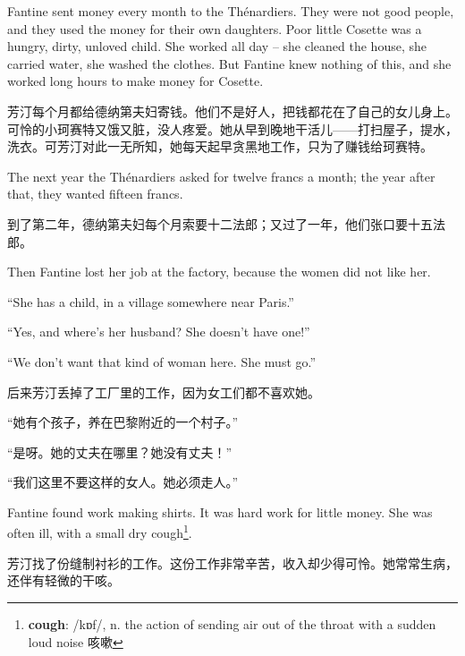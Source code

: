\documentclass[fontset=ubuntu, zihao=5]{ctexart}
\newcommand\doulos[1]{{\fontspec{Doulos SIL} /#1/}}
\begin{document}
\begin{paracol}{2}
  \sectionbreak

  Fantine sent money every month to the Thénardiers. They were not good people, and they used the money for their own daughters. Poor little Cosette was a hungry, dirty, unloved child. She worked all day – she cleaned the house, she carried water, she washed the clothes. But Fantine knew nothing of this, and she worked long hours to make money for Cosette.

  \switchcolumn

  \sectionbreak

  芳汀每个月都给德纳第夫妇寄钱。他们不是好人，把钱都花在了自己的女儿身上。可怜的小珂赛特又饿又脏，没人疼爱。她从早到晚地干活儿——打扫屋子，提水，洗衣。可芳汀对此一无所知，她每天起早贪黑地工作，只为了赚钱给珂赛特。

  \switchcolumn*

  The next year the Thénardiers asked for twelve francs a month; the year after that, they wanted fifteen francs.

  \switchcolumn

  到了第二年，德纳第夫妇每个月索要十二法郎；又过了一年，他们张口要十五法郎。

  \switchcolumn*

  Then Fantine lost her job at the factory, because the women did not like her.


  ``She has a child, in a village somewhere near Paris.''


  ``Yes, and where's her husband? She doesn't have one!''


  ``We don't want that kind of woman here. She must go.''


  \switchcolumn

  后来芳汀丢掉了工厂里的工作，因为女工们都不喜欢她。


  “她有个孩子，养在巴黎附近的一个村子。”


  “是呀。她的丈夫在哪里？她没有丈夫！”


  “我们这里不要这样的女人。她必须走人。”

  \switchcolumn*

  Fantine found work making shirts. It was hard work for little money. She was
  often ill, with a small dry cough\footnote{\textbf{cough}: \doulos{kɒf}, n.
    the action of sending air out of the throat with a sudden loud noise 咳嗽}.

  \switchcolumn

  芳汀找了份缝制衬衫的工作。这份工作非常辛苦，收入却少得可怜。她常常生病，还伴有轻微的干咳。


\end{paracol}
\end{document}
